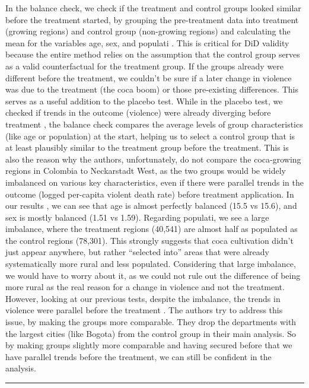 \documentclass[
]{article}
\begin{document}
In the balance check, we check if the treatment and control groups
looked similar before the treatment started, by grouping the
pre-treatment data into treatment (growing regions) and control group
(non-growing regions) and calculating the mean for the variables age,
sex, and populati . This is critical for DiD validity because the entire
method relies on the assumption that the control group serves as a valid
counterfactual for the treatment group. If the groups already were
different before the treatment, we couldn't be sure if a later change in
violence was due to the treatment (the coca boom) or those pre-existing
differences. This serves as a useful addition to the placebo test. While
in the placebo test, we checked if trends in the outcome (violence) were
already diverging before treatment , the balance check compares the
average levels of group characteristics (like age or population) at the
start, helping us to select a control group that is at least plausibly
similar to the treatment group before the treatment. This is also the
reason why the authors, unfortunately, do not compare the coca-growing
regions in Colombia to Neckarstadt West, as the two groups would be
widely imbalanced on various key characteristics, even if there were
parallel trends in the outcome (logged per-capita violent death rate)
before treatment application. In our results , we can see that age is
almost perfectly balanced (15.5 vs 15.6), and sex is mostly balanced
(1.51 vs 1.59). Regarding populati, we see a large imbalance, where the
treatment regions (40,541) are almost half as populated as the control
regions (78,301). This strongly suggests that coca cultivation didn't
just appear anywhere, but rather ``selected into'' areas that were
already systematically more rural and less populated. Considering that
large imbalance, we would have to worry about it, as we could not rule
out the difference of being more rural as the real reason for a change
in violence and not the treatment. However, looking at our previous
tests, despite the imbalance, the trends in violence were parallel
before the treatment . The authors try to address this issue, by making
the groups more comparable. They drop the departments with the largest
cities (like Bogota) from the control group in their main analysis. So
by making groups slightly more comparable and having secured before that
we have parallel trends before the treatment, we can still be confident
in the analysis.

\begin{center}\rule{0.5\linewidth}{0.5pt}\end{center}
\end{document}
